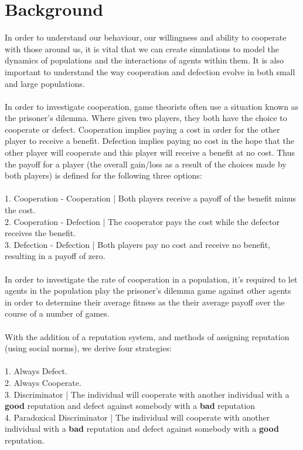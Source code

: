 \documentclass[10pt,a4paper]{article}
\begin{document}
\section{Background}
In order to understand our behaviour, our willingness and ability to cooperate with those around us, it is vital that we can create simulations to model the dynamics of populations and the interactions of agents within them.
It is also important to understand the way cooperation and defection evolve in both small and large populations.
\\\\
In order to investigate cooperation, game theorists often use a situation known as the prisoner's dilemma.
Where given two players, they both have the choice to cooperate or defect. 
Cooperation implies paying a cost in order for the other player to receive a benefit.
Defection implies paying no cost in the hope that the other player will cooperate and this player will receive a benefit at no cost.
Thus the payoff for a player (the overall gain/loss as a result of the choices made by both players) is defined for the following three options:
\\
\\ 1. Cooperation - Cooperation | Both players receive a payoff of the benefit minus the cost.
\\ 2. Cooperation - Defection | The cooperator pays the cost while the defector receives the benefit.
\\ 3. Defection - Defection | Both players pay no cost and receive no benefit, resulting in a payoff of zero.
\\\\
In order to investigate the rate of cooperation in a population, it's required to let agents in the population play the prisoner's dilemma game against other agents in order to determine their average fitness as the their average payoff over the course of a number of games.
\\\\
With the addition of a reputation system, and methods of assigning reputation (using social norms), we derive four strategies:
\\
\\ 1. Always Defect.
\\ 2. Always Cooperate.
\\ 3. Discriminator | The individual will cooperate with another individual with a \textbf{good} reputation and defect against somebody with a \textbf{bad} reputation
\\ 4. Paradoxical Discriminator | The individual will cooperate with another individual with a \textbf{bad} reputation and defect against somebody with a \textbf{good} reputation.
\end{document}
